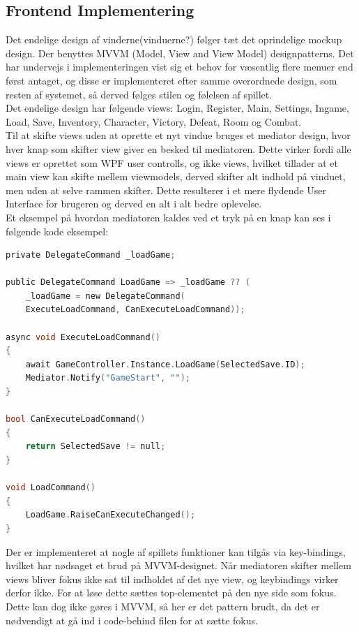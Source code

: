 \subsection{Frontend Implementering}
\label{sec:Frontend Implementering}
Det endelige design af vinderne(vinduerne?) følger tæt det oprindelige mockup design. Der benyttes MVVM (Model, View and View Model) designpatterns.  Det har undervejs i implementeringen vist sig et behov for væsentlig flere menuer end først antaget, og disse er implementeret efter samme overordnede design, som resten af systemet, så derved følges stilen og følelsen af spillet.\\
Det endelige design har følgende views:
Login, Register, Main, Settings, Ingame, Load, Save, Inventory, Character, Victory, Defeat, Room og Combat.\\
Til at skifte views uden at oprette et nyt vindue bruges et mediator design, hvor hver knap som skifter view giver en besked til mediatoren. Dette virker fordi alle views er oprettet som WPF user controlls, og ikke views, hvilket tillader at et main view kan skifte mellem viewmodels, derved skifter alt indhold på vinduet, men uden at selve rammen skifter. Dette resulterer i et mere flydende User Interface for brugeren og derved en alt i alt bedre oplevelse. \cite{Mediator}\\
Et eksempel på hvordan mediatoren kaldes ved et tryk på en knap kan ses i følgende kode eksempel:

\begin{lstlisting}[language=c]
private DelegateCommand _loadGame;
    
public DelegateCommand LoadGame => _loadGame ?? (
	_loadGame = new DelegateCommand(
	ExecuteLoadCommand, CanExecuteLoadCommand));

async void ExecuteLoadCommand()
{
    await GameController.Instance.LoadGame(SelectedSave.ID);
    Mediator.Notify("GameStart", "");
}

bool CanExecuteLoadCommand()
{
    return SelectedSave != null;
}

void LoadCommand()
{
    LoadGame.RaiseCanExecuteChanged();
}
\end{lstlisting}

\noindent Der er implementeret at nogle af spillets funktioner kan tilgås via key-bindings, hvilket har nødsaget et brud på MVVM-designet. Når mediatoren skifter mellem views bliver fokus ikke sat til indholdet af det nye view, og keybindings virker derfor ikke. For at løse dette sættes top-elementet på den nye side som fokus. Dette kan dog ikke gøres i MVVM, så her er det pattern brudt, da det er nødvendigt at gå ind i code-behind filen for at sætte fokus.

